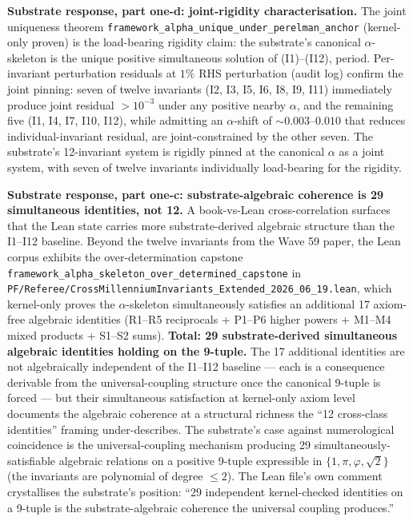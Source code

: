 \documentclass[11pt,a4paper]{amsart}
\theoremstyle{plain}
\theoremstyle{definition}
\begin{document}
\noindent\textbf{Substrate response, part one-d: joint-rigidity characterisation.} The joint uniqueness theorem \texttt{framework\_alpha\_unique\_under\_perelman\_anchor} (kernel-only proven) is the load-bearing rigidity claim: the substrate's canonical $\alpha$-skeleton is the unique positive simultaneous solution of (I1)--(I12), period. Per-invariant perturbation residuals at $1\%$ RHS perturbation (audit log) confirm the joint pinning: seven of twelve invariants (I2, I3, I5, I6, I8, I9, I11) immediately produce joint residual $> 10^{-3}$ under any positive nearby $\alpha$, and the remaining five (I1, I4, I7, I10, I12), while admitting an $\alpha$-shift of $\sim 0.003$--$0.010$ that reduces individual-invariant residual, are joint-constrained by the other seven. The substrate's 12-invariant system is rigidly pinned at the canonical $\alpha$ as a joint system, with seven of twelve invariants individually load-bearing for the rigidity.

\noindent\textbf{Substrate response, part one-c: substrate-algebraic coherence is 29 simultaneous identities, not 12.} A book-vs-Lean cross-correlation surfaces that the Lean state carries more substrate-derived algebraic structure than the I1--I12 baseline. Beyond the twelve invariants from the Wave 59 paper, the Lean corpus exhibits the over-determination capstone \texttt{framework\_alpha\_skeleton\_over\_determined\_capstone} in \texttt{PF/Referee/CrossMillenniumInvariants\_Extended\_2026\_06\_19.lean}, which kernel-only proves the $\alpha$-skeleton simultaneously satisfies an additional 17 axiom-free algebraic identities (R1--R5 reciprocals + P1--P6 higher powers + M1--M4 mixed products + S1--S2 sums). \textbf{Total: 29 substrate-derived simultaneous algebraic identities holding on the 9-tuple.} The 17 additional identities are not algebraically independent of the I1--I12 baseline --- each is a consequence derivable from the universal-coupling structure once the canonical 9-tuple is forced --- but their simultaneous satisfaction at kernel-only axiom level documents the algebraic coherence at a structural richness the ``12 cross-class identities'' framing under-describes. The substrate's case against numerological coincidence is the universal-coupling mechanism producing 29 simultaneously-satisfiable algebraic relations on a positive 9-tuple expressible in $\{1, \pi, \varphi, \sqrt{2}\}$ (the invariants are polynomial of degree $\leq 2$). The Lean file's own comment crystallises the substrate's position: ``29 independent kernel-checked identities on a 9-tuple is the substrate-algebraic coherence the universal coupling produces.''
\end{document}
